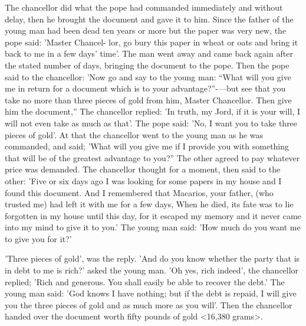 The chancellor did what the pope had commanded immediately
and without delay, then he brought the document and gave it to
him. Since the father of the young man had been dead ten years or
more but the paper was very new, the pope said: 'Master Chancel-
lor, go bury this paper in wheat or oats and bring it back to me in
a few days' time'. The man went away and came back again after
the stated number of days, bringing the document to the pope. Then
the pope said to the chancellor: 'Now go and say to the young man:
“What will you give me in return for a document which is to your
advantage?”-—but see that you take no more than three pieces of
gold from him, Master Chancellor. Then give him the document,”
The chancellor replied: 'In truth, my Jord, if it is your will, I will not
even take as much as that'. The pope said: 'No, I want you to take
three pieces of gold'. At that the chancellor went to the young man
as he was commanded, and said; 'What will you give me if I provide
you with something that will be of the greatest advantage to you?”
The other agreed to pay whatever price was demanded. The
chancellor thought for a moment, then said to the other: 'Five or six
days ago I was looking for some papers in my house and I found
this document. And I remembered that Macarios, your father, (who
trusted me) had left it with me for a few days, When he died, its
fate was to lie forgotten in my house until this day, for it escaped
my memory and it never came into my mind to give it to you.' The
young man said: 'How much do you want me to give you for it?'

'Three pieces of gold', was the reply. 'And do you know whether the
party that is in debt to me is rich?' asked the young man. 'Oh yes,
rich indeed', the chancellor replied; 'Rich and generous. You shall
easily be able to recover the debt.' The young man said: 'God
knows I have nothing; but if the debt is repaid, I will give you the
three pieces of gold and as much more as you will'. Then the
chancellor handed over the document worth fifty pounds of gold
<16,380 grams>.

